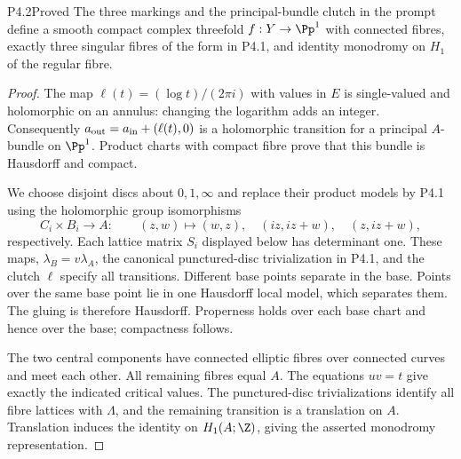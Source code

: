 \begin{statement}{P4.2}{Proved}
The three markings and the principal-bundle clutch in the prompt define a
smooth compact complex threefold $f:Y\to\Pp^1$ with connected fibres,
exactly three singular fibres of the form in P4.1, and identity monodromy
on $H_1$ of the regular fibre.
\end{statement}
\begin{proof}
The map $\ell(t)=(\log t)/(2\pi i)$ with values in $E$ is single-valued and
holomorphic on an annulus: changing the logarithm adds an integer.
Consequently $a_{\rm out}=a_{\rm in}+(\ell(t),0)$ is a holomorphic transition
for a principal $A$-bundle on $\Pp^1$. Product charts with compact fibre
prove that this bundle is Hausdorff and compact.

We choose disjoint discs about $0,1,\infty$ and replace their product models
by P4.1 using the holomorphic group isomorphisms
\[
 C_i\times B_i\longrightarrow A:\qquad
 (z,w)\mapsto(w,z),\quad(iz,iz+w),\quad(z,iz+w),
\]
respectively. Each lattice matrix $S_i$ displayed below has determinant
one. These maps, $\lambda_B=v\lambda_A$, the canonical punctured-disc
trivialization in P4.1, and the clutch $\ell$ specify all transitions.
Different base points separate in the base. Points over the same base
point lie in one Hausdorff local model, which separates them. The gluing is
therefore Hausdorff. Properness holds over each base chart and hence over
the base; compactness follows.

The two central components have connected elliptic fibres over connected
curves and meet each other. All remaining fibres equal $A$. The equations
$uv=t$ give exactly the indicated critical values. The punctured-disc
trivializations identify all fibre lattices with $\Lambda$, and the remaining
transition is a translation on $A$. Translation induces the identity on
$H_1(A;\Z)$, giving the asserted monodromy representation.
\end{proof}

